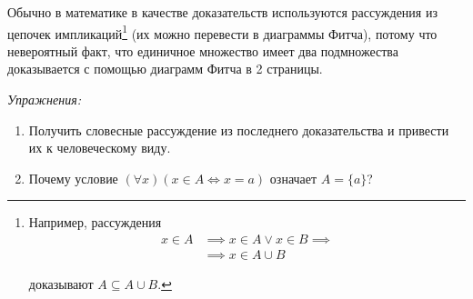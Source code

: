 Обычно в математике в качестве доказательств используются рассуждения
из цепочек импликаций\footnote{
	Например, рассуждения
	\[
		\begin{aligned}
			x\in A
			 & \implies x\in A\lor x\in B\implies \\
			 & \implies x\in A\cup B
		\end{aligned}
	\]

	доказывают $A\subseteq A\cup B$.
} (их можно перевести в диаграммы Фитча),
потому что невероятный факт, что единичное множество имеет два подмножества доказывается
с помощью диаграмм Фитча в 2 страницы.

{\it Упражнения:}
\begin{enumerate}
	\item{}Получить словесные рассуждение из последнего доказательства и привести их
	к человеческому виду.
	\item{}Почему условие ${(\forall x)(x\in A\iff x=a)}$ означает $A=\{a\}$?
\end{enumerate}

